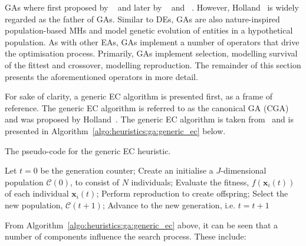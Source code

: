 \Acp{GA} where first proposed by \citeauthor{ref:fraser:1957}~\cite{ref:fraser:1957} and later by \citeauthor{ref:bremermann:1962}~\cite{ref:bremermann:1962} and \citeauthor{ref:reed:1967}~\cite{ref:reed:1967}. However, Holland~\cite{ref:holland:1992} is widely regarded as the father of \acp{GA}. Similar to \acp{DE}, \acp{GA} are also nature-inspired population-based \acp{MH} and model genetic evolution of entities in a hypothetical population. As with other \acp{EA}, \acp{GA} implement a number of operators that drive the optimisation process. Primarily, \acp{GA} implement selection, modelling survival of the fittest and crossover, modelling reproduction. The remainder of this section presents the aforementioned operators in more detail.

For sake of clarity, a generic \acs{EC} algorithm is presented first, as a frame of reference. The generic \acs{EC} algorithm is referred to as the canonical \acs{GA} (CGA) and was proposed by Holland~\cite{ref:holland:1992}. The generic \acs{EC} algorithm is taken from~\cite{ref:engelbrecht:2007} and is presented in Algorithm~\ref{algo:heuristics:ga:generic_ec} below.

\begin{algorithm}[htb]
      \caption{The pseudo-code for the generic \acs{EC} heuristic.}
      \label{algo:heuristics:ga:generic_ec}
      \begin{algorithmic}
            \State Let $t = 0$ be the generation counter;
            \State Create an initialise a $J$-dimensional population $\mathcal{C}(0)$, to consist of $N$ individuals;
            \State Evaluate the fitness, $f(\boldsymbol{x}_{i}(t))$ of each individual $\boldsymbol{x}_{i}(t)$;
            \State Perform reproduction to create offspring;
            \State Select the new population, $\mathcal{C}(t+1)$;
            \State Advance to the new generation, i.e. $t = t + 1$
            \EndWhile
            \State
      \end{algorithmic}
\end{algorithm}

From Algorithm~\ref{algo:heuristics:ga:generic_ec} above, it can be seen that a number of components influence the search process. These include:

